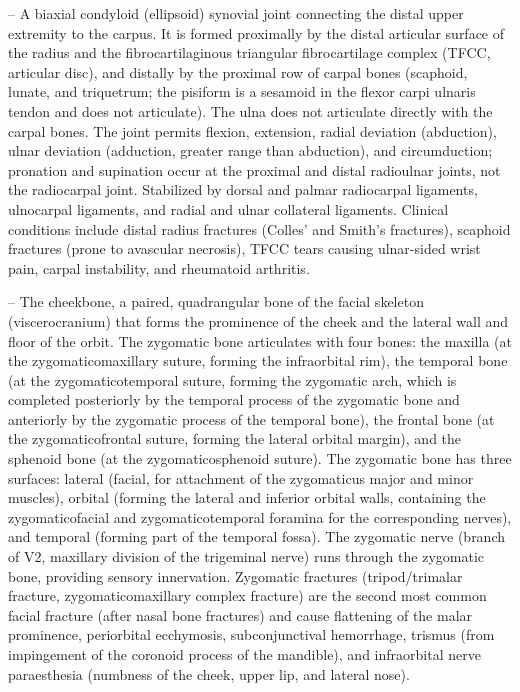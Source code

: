 -- A biaxial condyloid (ellipsoid) synovial joint connecting the distal upper extremity to the carpus. It is formed proximally by the distal articular surface of the radius and the fibrocartilaginous triangular fibrocartilage complex (TFCC, articular disc), and distally by the proximal row of carpal bones (scaphoid, lunate, and triquetrum; the pisiform is a sesamoid in the flexor carpi ulnaris tendon and does not articulate). The ulna does not articulate directly with the carpal bones. The joint permits flexion, extension, radial deviation (abduction), ulnar deviation (adduction, greater range than abduction), and circumduction; pronation and supination occur at the proximal and distal radioulnar joints, not the radiocarpal joint. Stabilized by dorsal and palmar radiocarpal ligaments, ulnocarpal ligaments, and radial and ulnar collateral ligaments. Clinical conditions include distal radius fractures (Colles' and Smith's fractures), scaphoid fractures (prone to avascular necrosis), TFCC tears causing ulnar-sided wrist pain, carpal instability, and rheumatoid arthritis.

-- The cheekbone, a paired, quadrangular bone of the facial skeleton (viscerocranium) that forms the prominence of the cheek and the lateral wall and floor of the orbit. The zygomatic bone articulates with four bones: the maxilla (at the zygomaticomaxillary suture, forming the infraorbital rim), the temporal bone (at the zygomaticotemporal suture, forming the zygomatic arch, which is completed posteriorly by the temporal process of the zygomatic bone and anteriorly by the zygomatic process of the temporal bone), the frontal bone (at the zygomaticofrontal suture, forming the lateral orbital margin), and the sphenoid bone (at the zygomaticosphenoid suture). The zygomatic bone has three surfaces: lateral (facial, for attachment of the zygomaticus major and minor muscles), orbital (forming the lateral and inferior orbital walls, containing the zygomaticofacial and zygomaticotemporal foramina for the corresponding nerves), and temporal (forming part of the temporal fossa). The zygomatic nerve (branch of V2, maxillary division of the trigeminal nerve) runs through the zygomatic bone, providing sensory innervation. Zygomatic fractures (tripod/trimalar fracture, zygomaticomaxillary complex fracture) are the second most common facial fracture (after nasal bone fractures) and cause flattening of the malar prominence, periorbital ecchymosis, subconjunctival hemorrhage, trismus (from impingement of the coronoid process of the mandible), and infraorbital nerve paraesthesia (numbness of the cheek, upper lip, and lateral nose).

